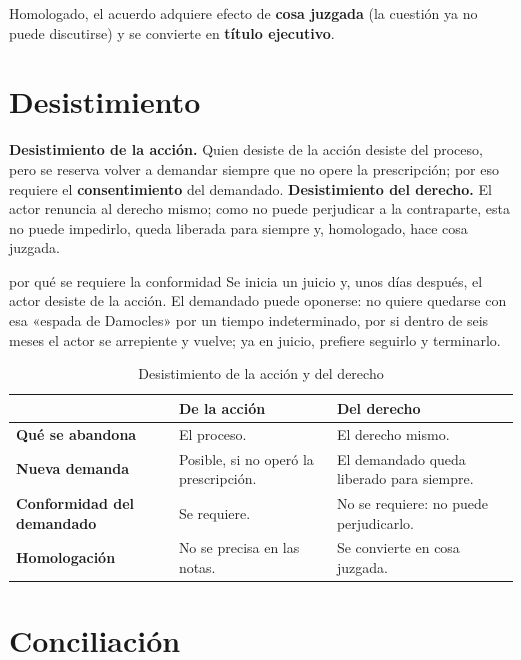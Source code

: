 \documentclass[12pt,oneside]{book}
\begin{document}
\begin{importante}
Homologado, el acuerdo adquiere efecto de \textbf{cosa juzgada} (la cuestión ya no puede discutirse) y se convierte en \textbf{título ejecutivo}.
\end{importante}

\section{Desistimiento}

\textbf{Desistimiento de la acción.} Quien desiste de la acción desiste del proceso, pero se reserva volver a demandar siempre que no opere la prescripción; por eso requiere el \textbf{consentimiento} del demandado. \textbf{Desistimiento del derecho.} El actor renuncia al derecho mismo; como no puede perjudicar a la contraparte, esta no puede impedirlo, queda liberada para siempre y, homologado, hace cosa juzgada.

\begin{ejemplo}{por qué se requiere la conformidad}
Se inicia un juicio y, unos días después, el actor desiste de la acción. El demandado puede oponerse: no quiere quedarse con esa «espada de Damocles» por un tiempo indeterminado, por si dentro de seis meses el actor se arrepiente y vuelve; ya en juicio, prefiere seguirlo y terminarlo.
\end{ejemplo}

\begin{table}[H]
\centering
\caption{Desistimiento de la acción y del derecho}
\begin{tabularx}{\textwidth}{>{\raggedright\arraybackslash\bfseries}p{} X X}
\toprule
 & De la acción & Del derecho \\
\midrule
Qué se abandona & El proceso. & El derecho mismo. \\
Nueva demanda & Posible, si no operó la prescripción. & El demandado queda liberado para siempre. \\
Conformidad del demandado & Se requiere. & No se requiere: no puede perjudicarlo. \\
Homologación & %
No se precisa en las notas. & Se convierte en cosa juzgada. \\
\bottomrule
\end{tabularx}
\end{table}

\section{Conciliación}
\end{document}
